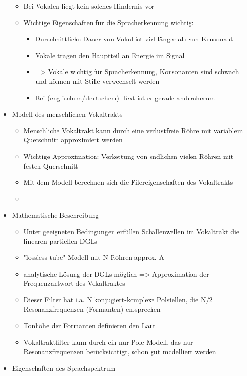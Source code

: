 \documentclass[a4paper,10pt,oneside]{article}
\begin{document}
\begin{itemize}
\begin{itemize}
				\item Bei Vokalen liegt kein solches Hindernis vor
				\item Wichtige Eigenschaften für die Spracherkennung wichtig:
					\begin{itemize}
						\item Durschnittliche Dauer von Vokal ist viel länger als von Konsonant
						\item Vokale tragen den Hauptteil an Energie im Signal
						\item => Vokale wichtig für Spracherkennung, Konsonanten sind schwach und können mit Stille verwechselt werden
						\item Bei (englischem/deutschem) Text ist es gerade andersherum
					\end{itemize}
			\end{itemize}
		\item Modell des menschlichen Vokaltrakts
			\begin{itemize}
				\item Menschliche Vokaltrakt kann durch eine verlustfreie Röhre mit variablem Querschnitt approximiert werden
				\item Wichtige Approximation: Verkettung von endlichen vielen Röhren mit festen Querschnitt
				\item Mit dem Modell berechnen sich die Filereigenschaften des Vokaltrakts
				\item [] %
			\end{itemize}
		\item Mathematische Beschreibung
			\begin{itemize}
				\item Unter geeigneten Bedingungen erfüllen Schallenwellen im Vokaltrakt die linearen partiellen DGLs
				\item "lossless tube"-Modell mit N Röhren approx. A
				\item analytische Lösung der DGLs möglich => Approximation der Frequenzantwort des Vokaltraktes
				\item Dieser Filter hat i.a. N konjugiert-komplexe Polstellen, die N/2 Resonanzfrequenzen (Formanten) entsprechen
				\item Tonhöhe der Formanten definieren den Laut
				\item Vokaltraktfilter kann durch ein nur-Pole-Modell, das nur Resonanzfrequenzen berücksichtigt, schon gut modelliert werden
			\end{itemize}
		\item Eigenschaften des Sprachspektrum

\end{itemize}
\end{document}
